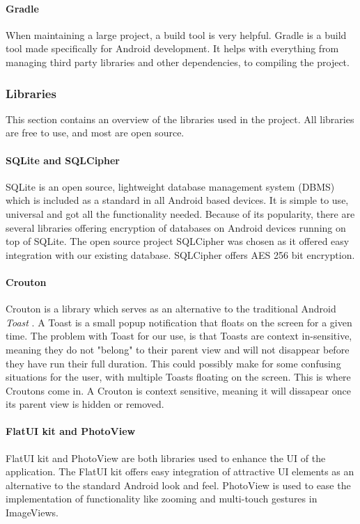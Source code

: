\paragraph*{Gradle}
When maintaining a large project, a build tool is very helpful. Gradle \cite{gradle} is a build tool made specifically for Android development. It helps with everything from managing third party libraries and other dependencies, to compiling the project.

\subsubsection{Libraries}
This section contains an overview of the libraries used in the project. All libraries are free to use, and most are open source.

\paragraph*{SQLite and SQLCipher}
SQLite is an open source, lightweight database management system (DBMS) which is included as a standard in all Android based devices. It is simple to use, universal and got all the functionality needed. Because of its popularity, there are several libraries offering encryption of databases on Android devices running on top of SQLite. The open source project SQLCipher \cite{sqlcipher} was chosen as it offered easy integration with our existing database. SQLCipher offers AES 256 bit encryption.

\paragraph*{Crouton}
Crouton \cite{crouton} is a library which serves as an alternative to the traditional Android \textit{Toast} \cite{toast}. A Toast is a small popup notification that floats on the screen for a given time. The problem with Toast for our use, is that Toasts are context in-sensitive, meaning they do not "belong" to their parent view and will not disappear before they have run their full duration. This could possibly make for some confusing situations for the user, with multiple Toasts floating on the screen. This is where Croutons come in. A Crouton is context sensitive, meaning it will dissapear once its parent view is hidden or removed.

\paragraph*{FlatUI kit and PhotoView}
FlatUI kit \cite{flatui} and PhotoView \cite{photoview} are both libraries used to enhance the UI of the application. The FlatUI kit offers easy integration of attractive UI elements as an alternative to the standard Android look and feel. PhotoView is used to ease the implementation of functionality like zooming and multi-touch gestures in ImageViews.


